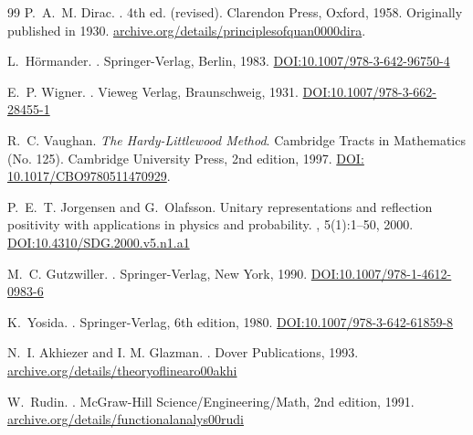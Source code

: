 \documentclass{article}
\numberwithin{equation}{section}
\theoremstyle{plain}
\theoremstyle{definition}
\theoremstyle{remark}
\begin{document}
\begin{thebibliography}{99}
P.~A.~M. Dirac.
.
\newblock 4th ed. (revised).
\newblock Clarendon Press, Oxford, 1958.
\newblock Originally published in 1930.
\newblock \href{https://archive.org/details/principlesofquan0000dira}{archive.org/details/principlesofquan0000dira}.


L.~H{\"o}rmander.
.
\newblock Springer-Verlag, Berlin, 1983.
\href{https://doi.org/10.1007/978-3-642-96750-4}{DOI:10.1007/978-3-642-96750-4}

E.~P. Wigner.
.
\newblock Vieweg Verlag, Braunschweig, 1931.
\href{https://doi.org/10.1007/978-3-662-28455-1}{DOI:10.1007/978-3-662-28455-1}

R.~C. Vaughan.
\newblock \emph{The Hardy-Littlewood Method}.
\newblock Cambridge Tracts in Mathematics (No. 125). Cambridge University Press, 2nd edition, 1997.
\newblock \href{https://doi.org/10.1017/CBO9780511470929}{DOI: 10.1017/CBO9780511470929}.

P.~E.~T. Jorgensen and G.~Olafsson.
\newblock Unitary representations and reflection positivity with applications in physics and probability.
, 5(1):1--50, 2000.
\href{https://doi.org/10.4310/SDG.2000.v5.n1.a1}{DOI:10.4310/SDG.2000.v5.n1.a1}

M.~C. Gutzwiller.
.
\newblock Springer-Verlag, New York, 1990.
\href{https://doi.org/10.1007/978-1-4612-0983-6}{DOI:10.1007/978-1-4612-0983-6}

K.~Yosida.
.
\newblock Springer-Verlag, 6th edition, 1980.
\href{https://doi.org/10.1007/978-3-642-61859-8}{DOI:10.1007/978-3-642-61859-8}

N.~I. Akhiezer and I. M. Glazman.
.
\newblock Dover Publications, 1993.
\href{https://archive.org/details/theoryoflinearo00akhi}{archive.org/details/theoryoflinearo00akhi}

W.~Rudin.
.
\newblock McGraw-Hill Science/Engineering/Math, 2nd edition, 1991.
\href{https://archive.org/details/functionalanalys00rudi}{archive.org/details/functionalanalys00rudi}


\end{thebibliography}
\end{document}
